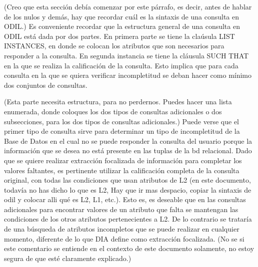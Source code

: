 (Creo que esta sección debía comenzar por este párrafo, es decir, antes de hablar de los nulos y demás, hay que recordar cuál es la sintaxis de una consulta en ODIL.) Es conveniente recordar que la estructura general de una consulta en ODIL está dada por dos partes. En primera parte se tiene la claúsula LIST INSTANCES, en donde se colocan los atributos que son necesarios para responder a la consulta. En segunda instancia se tiene la cláusula SUCH THAT en la que se realiza la calificación de la consulta. Esto implica que para cada consulta en la que se quiera verificar incompletitud se deban hacer como mínimo dos conjuntos de consultas.

	(Esta parte necesita estructura, para no perdernos. Puedes hacer una lista enumerada, donde coloques los dos tipos de consultas adicionales o dos subsecciones, para los dos tipos de consultas adicionales.) Puede verse que el primer tipo de consulta sirve para determinar un tipo de incompletitud de la Base de Datos en el cual no se puede responder la consulta del usuario porque la información que se desea no está presente en las tuplas de la bd relacional. Dado que se quiere realizar extracción focalizada de información para completar los valores faltantes, es pertinente utilizar la calificación completa de la consulta original, con todas las condiciones que usan atributos de L2 (en este documento, todavía no has dicho lo que es L2, Hay que ir mas despacio, copiar la sintaxis de odil y colocar alli qué es L2, L1, etc.). Esto es, es deseable que en las consultas adicionales para encontrar valores de un atributo que falta se mantengan las condiciones de los otros atributos pertenecientes a L2.   De lo contrario se trataría de una búsqueda de atributos incompletos que se puede realizar en cualquier momento, diferente de lo que DIA define como extracción focalizada. (No se si este comentario se entiende en el contexto de este documento solamente, no estoy segura de que esté claramente explicado.)

